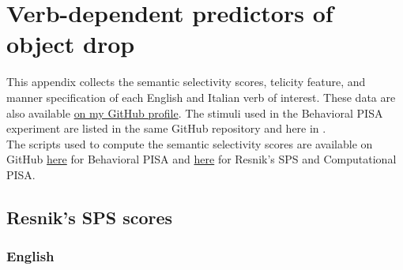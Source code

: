 \setchapterpreamble[u]{\margintoc}
\chapter{Verb-dependent predictors of object drop}


This appendix collects the semantic selectivity scores, telicity feature, and manner specification of each English and Italian verb of interest. These data are also available \href{https://github.com/giuliacappelli/dissertationData}{on my GitHub profile}. The stimuli used in the Behavioral PISA experiment are listed in the same GitHub repository and here in .\\
The scripts used to compute the semantic selectivity scores are available on GitHub  \href{https://github.com/giuliacappelli/behavioralPISA}{here} for Behavioral PISA and \href{https://github.com/ellepannitto/PISA}{here} for Resnik's SPS and Computational PISA.


\section{Resnik's SPS scores} 

\subsection{English}

